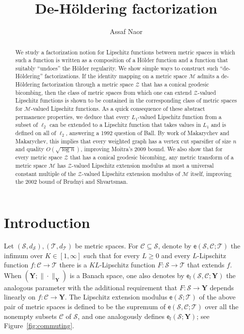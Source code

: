 \documentclass[11pt,reqno]{amsart}
\title{De-H\"oldering factorization}
\date{}
\author{Assaf Naor}
\renewcommand{\ge}{\geqslant}
\renewcommand{\subset}{\subseteq}
\newcommand{\ee}{\mathsf{e}}
\newcommand{\cZ}{\mathcal{Z}}
\newcommand{\MM}{\mathcal{M}}
\newcommand{\TT}{\mathscr{T}}
\renewcommand{\SS}{\mathscr{S}}
\newcommand{\sub}{\mathscr{C}}
\newcommand{\bY}{\mathbf{Y}}
\begin{document}
 

\begin{abstract} 
We study a factorization notion for Lipschitz functions between metric spaces in which such a function is written as a composition of a H\"older function and a function that suitably  ``undoes'' the H\"older regularity. We show simple ways to construct such ``de-H\"oldering'' factorizations. If the identity mapping on a metric space $\MM$ admits a de-H\"oldering factorization through a metric space $\cZ$ that has a conical geodesic bicombing,  then the class of metric spaces from  which one can extend $\cZ$-valued Lipschitz functions is shown to be contained  in   the corresponding class of metric spaces for $\MM$-valued Lipschitz functions. As a quick consequence of these abstract permanence properties, we deduce that every $L_1$-valued Lipschitz function from a subset of $\ell_2$ can be extended to a Lipschitz function that takes values in $L_1$ and is defined on all of $\ell_2$, answering a 1992 question of Ball. By work of Makarychev and Makarychev, this implies that every weighted graph has a vertex cut sparsifier of size $n$ and quality $O(\sqrt{\log n})$, improving Moitra's 2009  bound. We also show that for every metric space $\cZ$ that has a conical geodesic bicombing, any metric transform of a metric space $\MM$ has $\cZ$-valued Lipschitz extension modulus at most a universal  constant multiple of the $\cZ$-valued Lipschitz extension modulus of $\MM$ itself,  improving the 2002 bound of Brudnyi and Shvartsman. 
\end{abstract}

\maketitle

\vspace{-0.3in}





\section{Introduction}

Let $(\SS,d_\SS),(\TT,d_\TT)$ be metric spaces. For $\sub\subset \SS$, denote by $\ee(\SS,\sub;\TT)$ the infimum over $K\in [1,\infty]$ such that for every $L\ge 0$ and every $L$-Lipschitz function  $f:\sub\to \TT$ there is a $KL$-Lipschitz function $F:\SS\to \TT$ that extends $f$. When $(\bY;\|\cdot\|_\bY)$ is a Banach space, one also denotes by $\ee_l(\SS,\sub;\bY)$ the analogous parameter with the additional requirement that $F:\SS\to \bY$ depends linearly on $f:\sub\to \bY$. The Lipschitz extension modulus $\ee(\SS;\TT)$ of the above pair of metric spaces is  defined to be the supremum of $\ee(\SS,\sub;\TT)$ over all the nonempty subsets $\sub$ of $\SS$, and one analogously defines $\ee_l(\SS;\bY)$; see Figure~\ref{fig:commuting}. 
\end{document}
